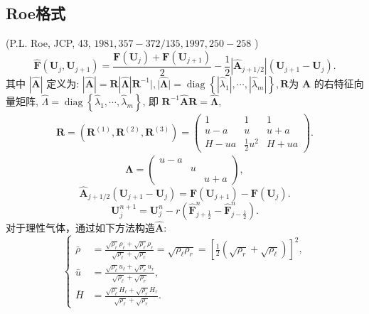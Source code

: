 \documentclass[12pt]{article}
\begin{document}
\subsection{Roe格式}

(P.L. Roe, JCP, 43, $1981,357-372 / 135,1997,250-258$ )
\begin{equation}
	\hat{\bm{F}}\left(\bm{U}_{j}, \bm{U}_{j+1}\right)=\frac{\bm{F}\left(\bm{U}_{j}\right)+\bm{F}\left(\bm{U}_{j+1}\right)}{2}-\frac{1}{2}\left|\hat{\bm{A}}_{j+1 / 2}\right|\left(\bm{U}_{j+1}-\bm{U}_{j}\right).
\end{equation}
其中 $|\hat{\bm{A}}|$ 定义为: $|\hat{\bm{A}}|=\bm{R}|\hat{\bm{\Lambda}}| \bm{R}^{-1}|,| \hat{\bm{\Lambda}} \mid=\operatorname{diag}\left\{\left|\hat{\lambda}_{1}\right|, \cdots,\left|\hat{\lambda}_{m}\right|\right\}, \bm{R}$为 $\hat{\bm{A}}$ 的右特征向量矩阵, $\hat{\Lambda}=\operatorname{diag}\left\{\hat{\lambda}_{1}, \cdots, \hat{\lambda}_{m}\right\}$, 即 $\bm{R}^{-1} \hat{\bm{A}} \bm{R}=\hat{\bm{\Lambda}}$,
\begin{equation}
	\begin{array}{c}
		\boldsymbol{R}=\left(\boldsymbol{R}^{(1)}, \boldsymbol{R}^{(2)}, \boldsymbol{R}^{(3)}\right)=\left(\begin{array}{ccc}
				1     & 1                 & 1     \\
				u-a   & u                 & u+a   \\
				H-u a & \frac{1}{2} u^{2} & H+u a
			\end{array}\right).
	\end{array}
\end{equation}
\begin{equation}
	\bm{\Lambda} = \begin{pmatrix}
		u-a &  & \\&u&\\&&u+a
	\end{pmatrix},
\end{equation}
\begin{equation}
	\hat{\bm{A}}_{j+1 / 2}\left(\bm{U}_{j+1}-\bm{U}_{j}\right)=\bm{F}\left(\bm{U}_{j+1}\right)-\bm{F}\left(\bm{U}_{j}\right).
\end{equation}
\begin{equation}
	\bm{U}^{n+1}_{j} =  \bm{U}^{n}_{j} - r \left( \hat{\bm{F}}^{n}_{j+\frac{1}{2}} - \hat{\bm{F}}^{n}_{j-\frac{1}{2}} \right).
\end{equation}
对于理性气体，通过如下方法构造$\hat{\bm{A}}$:
\begin{equation}
	\left\{
	\begin{aligned}
		\bar{\rho} & =\frac{\sqrt{\rho_{r}} \rho_{\ell}+\sqrt{\rho_{\ell}} \rho_{r}}{\sqrt{\rho_{\ell}}+\sqrt{\rho_{r}}}=\sqrt{\rho_{\ell} \rho_{r}}=\left[\frac{1}{2}\left(\sqrt{\rho_{r}} +\sqrt{\rho_{\ell}} \right)\right]^2, \\
		\bar{u}    & =\frac{\sqrt{\rho_{\ell}} u_{\ell}+\sqrt{\rho_{r}} u_{r}}{\sqrt{\rho_{\ell}}+\sqrt{\rho_{r}}},                                                                                                               \\
		\bar{H}    & =\frac{\sqrt{\rho_{\ell}} H_{\ell}+\sqrt{\rho_{r}} H_{r}}{\sqrt{\rho_{\ell}}+\sqrt{\rho_{r}}}.
	\end{aligned}\right.
\end{equation}
\end{document}
